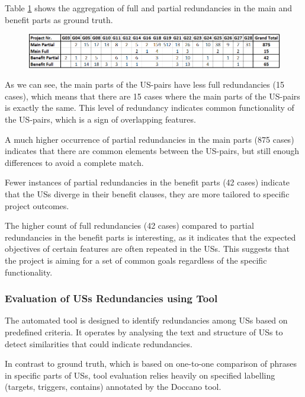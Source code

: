 Table \ref{tb:ground_truth} shows the aggregation of full and partial redundancies in the main and benefit parts as ground truth.
\begin{figure}[h]
	\begingroup
	\scriptsize
	\centering
	\includegraphics[scale=0.6]{Table/ground_truth.png}
	\label{tb:ground_truth}
	
	\endgroup
\end{figure}
As we can see, the main parts of the US-pairs have less full redundancies (15 cases), which means that there are 15 cases where the main parts of the US-pairs is exactly the same. This level of redundancy indicates common functionality of the US-pairs, which is a sign of overlapping features.

A much higher occurrence of partial redundancies in the main parts (875 cases) indicates that there are common elements between the US-pairs, but still enough differences to avoid a complete match.

Fewer instances of partial redundancies in the benefit parts (42 cases) indicate that the USs diverge in their benefit clauses, they are more tailored to specific project outcomes. 

The higher count of full redundancies (42 cases) compared to partial redundancies in the benefit parts is interesting, as it indicates that the expected objectives of certain features are often repeated in the USs. This suggests that the project is aiming for a set of common goals regardless of the specific functionality.
\subsubsection*{Evaluation of USs Redundancies using Tool}
The automated tool is designed to identify redundancies among USs based on predefined criteria. It operates by analysing the text and structure of USs to detect similarities that could indicate redundancies.

In contrast to ground truth, which is based on one-to-one comparison of phrases in specific parts of USs, tool evaluation relies heavily on specified labelling (targets, triggers, contains) annotated by the Doccano tool.

